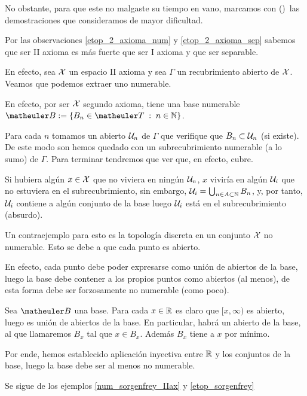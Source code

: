 No obstante, para que este no malgaste su tiempo en vano, marcamos con (\Lightning)\ las demostraciones que consideramos de mayor dificultad.
\begin{obs}
	Por las observaciones \ref{etop_2_axioma_num} y \ref{etop_2_axioma_sep} sabemos que ser II axioma es más fuerte que ser I axioma y que ser separable. 
\end{obs}
\begin{obs}
	En efecto, sea $\mathcal{X}$ un espacio II axioma y sea $\Gamma$ un recubrimiento abierto de $\mathcal{X}$. Veamos que podemos extraer uno numerable.
	
	En efecto, por ser $\mathcal{X}$ segundo axioma, tiene una base numerable $\B:=\{B_n\in\T\midc n\in\N\}$.
	
	Para cada $n$ tomamos un abierto $\mathcal{U}_n$ de $\Gamma$ que verifique que $B_n\subset \mathcal{U}_n$ (si existe). De este modo son hemos quedado con un subrecubrimiento numerable (a lo sumo) de $\Gamma$. Para terminar tendremos que ver que, en efecto, cubre.
	
	Si hubiera algún $x\in\mathcal{X}$ que no viviera en ningún $\mathcal{U}_n$, $x$ viviría en algún $\mathcal{U}_i$ que no estuviera en el subrecubrimiento, sin embargo, $\mathcal{U}_i=\bigcup_{n\in A\subset\mathbb{N}} B_n$, y, por tanto, $\mathcal{U}_i$ contiene a algún conjunto de la base luego $\mathcal{U}_i$ está en el subrecubrimiento (absurdo).
\end{obs}
\begin{obs}
	Un contraejemplo para esto es la topología discreta en un conjunto $\mathcal{X}$ no numerable. Esto se debe a que cada punto es abierto.
	
	En efecto, cada punto debe poder expresarse como unión de abiertos de la base, luego la base debe contener a los propios puntos como abiertos (al menos), de esta forma debe ser forzosamente no numerable (como poco).
\end{obs}
\begin{exa}[$(\R,\T_{[,)})$ no es II axioma]
	\label{num_sorgenfrey_IIax}
	Sea $\B$ una base. Para cada $x\in\mathbb{R}$ es claro que $[x,\infty)$ es abierto, luego es unión de abiertos de la base. En particular, habrá un abierto de la base, al que llamaremos $B_x$ tal que $x\in B_x$. Además $B_x$ tiene a $x$ por mínimo.
	
	Por ende, hemos establecido aplicación inyectiva entre $\mathbb{R}$ y los conjuntos de la base, luego la base debe ser al menos no numerable.
\end{exa}
\begin{obs}
	Se sigue de los ejemplos \ref{num_sorgenfrey_IIax} y \ref{etop_sorgenfrey}
\end{obs}
